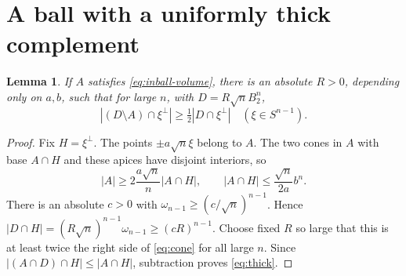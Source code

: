\documentclass[11pt]{article}
\newtheorem{lemma}[theorem]{Lemma}
\begin{document}
\section{A ball with a uniformly thick complement}
\begin{lemma}\label{lem:thick}
If $A$ satisfies \eqref{eq:inball-volume}, there is an absolute $R>0$,
depending only on $a,b$, such that for large $n$, with
$D=R\sqrt nB_2^n$,
\begin{equation}\label{eq:thick}
 |(D\setminus A)\cap\xi^\perp|\geq\tfrac12|D\cap\xi^\perp|
 \quad(\xi\in S^{n-1}).
\end{equation}
\end{lemma}
\begin{proof}
Fix $H=\xi^\perp$. The points $\pm a\sqrt n\xi$ belong to $A$. The two cones
in $A$ with base $A\cap H$ and these apices have disjoint interiors, so
\begin{equation}\label{eq:cone}
 |A|\geq2\frac{a\sqrt n}{n}|A\cap H|,
 \qquad |A\cap H|\leq\frac{\sqrt n}{2a}b^n.
\end{equation}
There is an absolute $c>0$ with
$\omega_{n-1}\geq(c/\sqrt n)^{n-1}$. Hence
$|D\cap H|=(R\sqrt n)^{n-1}\omega_{n-1}\geq(cR)^{n-1}$.
Choose fixed $R$ so large that this is at least twice the right side of
\eqref{eq:cone} for all large $n$. Since
$|(A\cap D)\cap H|\leq|A\cap H|$, subtraction proves \eqref{eq:thick}.
\end{proof}
\end{document}
